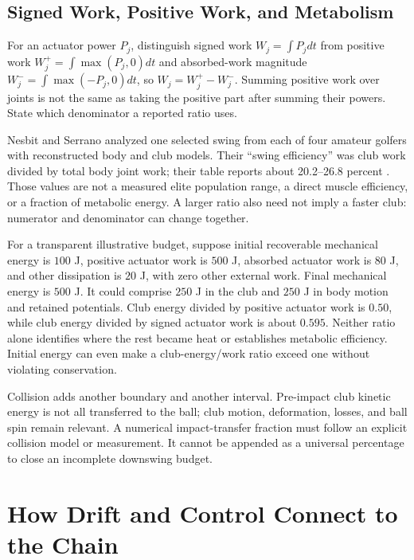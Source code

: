\subsection{Signed Work, Positive Work, and Metabolism}
For an actuator power $P_j$, distinguish signed work $W_j=\int P_jdt$ from positive work $W_j^+=\int\max(P_j,0)dt$ and absorbed-work magnitude $W_j^-=\int\max(-P_j,0)dt$, so $W_j=W_j^+-W_j^-$. Summing positive work over joints is not the same as taking the positive part after summing their powers. State which denominator a reported ratio uses.

Nesbit and Serrano analyzed one selected swing from each of four amateur golfers with reconstructed body and club models. Their ``swing efficiency'' was club work divided by total body joint work; their table reports about 20.2--26.8 percent \citep{Nesbit2005b}. Those values are not a measured elite population range, a direct muscle efficiency, or a fraction of metabolic energy. A larger ratio also need not imply a faster club: numerator and denominator can change together.

For a transparent illustrative budget, suppose initial recoverable mechanical energy is $100$ J, positive actuator work is $500$ J, absorbed actuator work is $80$ J, and other dissipation is $20$ J, with zero other external work. Final mechanical energy is $500$ J. It could comprise $250$ J in the club and $250$ J in body motion and retained potentials. Club energy divided by positive actuator work is $0.50$, while club energy divided by signed actuator work is about $0.595$. Neither ratio alone identifies where the rest became heat or establishes metabolic efficiency. Initial energy can even make a club-energy/work ratio exceed one without violating conservation.

Collision adds another boundary and another interval. Pre-impact club kinetic energy is not all transferred to the ball; club motion, deformation, losses, and ball spin remain relevant. A numerical impact-transfer fraction must follow an explicit collision model or measurement. It cannot be appended as a universal percentage to close an incomplete downswing budget.

\section{How Drift and Control Connect to the Chain}
